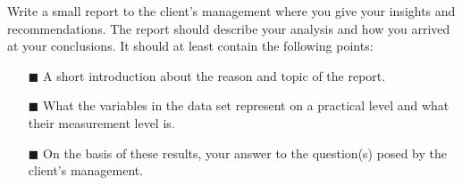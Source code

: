 Write a small report to the client's management where you give your insights and recommendations. The report should describe your analysis and how you arrived at your conclusions. It should at least contain the following points: \\

\begin{itemize}
    \item[$\blacksquare$] A short introduction about the reason and topic of the report.
    \item[$\blacksquare$] What the variables in the data set represent on a practical level and what their measurement level is. 
    
    \item[$\blacksquare$] On the basis of these results, your answer to the question(s) posed by the client's management.
\end{itemize}

\clearpage %